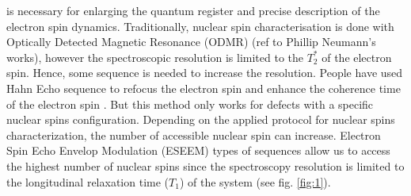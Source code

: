 \documentclass[%
 reprint,
superscriptaddress,
 amsmath,amssymb,
 aps,
]{revtex4-2}
\begin{document}
is necessary for enlarging the quantum register and precise description of the electron spin dynamics. Traditionally, nuclear spin characterisation is done with Optically Detected Magnetic Resonance (ODMR) (ref to Phillip Neumann's works), however the spectroscopic resolution is limited to the $T_2^\ast$ of the electron spin. Hence, some sequence is needed to increase the resolution. People have used Hahn Echo sequence to refocus the electron spin and enhance the coherence time of the electron spin \cite{childress2006coherent}. But this method only works for defects with a specific nuclear spins configuration. Depending on the applied protocol for nuclear spins characterization, the number of accessible nuclear spin can increase. Electron Spin Echo Envelop Modulation (ESEEM) types of sequences allow us to access the highest number of nuclear spins since the spectroscopy resolution is limited to the longitudinal relaxation time ($T_1$) of the system (see fig. \ref{fig:1}). 
\end{document}
